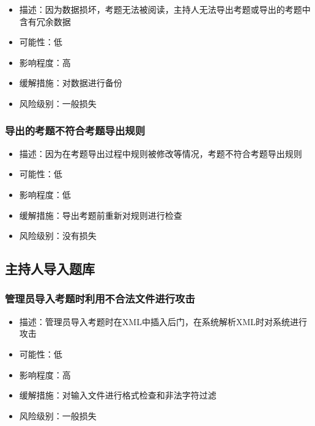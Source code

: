 \documentclass[hyperref, a4paper]{ctexart}
\providecommand{\tightlist}{%
  \setlength{\itemsep}{0pt}\setlength{\parskip}{0pt}}
\begin{document}
\begin{itemize}
\tightlist
\item
  描述：因为数据损坏，考题无法被阅读，主持人无法导出考题或导出的考题中含有冗余数据
\item
  可能性：低
\item
  影响程度：高
\item
  缓解措施：对数据进行备份
\item
  风险级别：一般损失
\end{itemize}

\hypertarget{ux5bfcux51faux7684ux8003ux9898ux4e0dux7b26ux5408ux8003ux9898ux5bfcux51faux89c4ux5219}{%
\subsubsection{导出的考题不符合考题导出规则}\label{ux5bfcux51faux7684ux8003ux9898ux4e0dux7b26ux5408ux8003ux9898ux5bfcux51faux89c4ux5219}}

\begin{itemize}
\tightlist
\item
  描述：因为在考题导出过程中规则被修改等情况，考题不符合考题导出规则
\item
  可能性：低
\item
  影响程度：低
\item
  缓解措施：导出考题前重新对规则进行检查
\item
  风险级别：没有损失
\end{itemize}

\hypertarget{ux4e3bux6301ux4ebaux5bfcux5165ux9898ux5e93-1}{%
\subsection{主持人导入题库}\label{ux4e3bux6301ux4ebaux5bfcux5165ux9898ux5e93-1}}

\hypertarget{ux7ba1ux7406ux5458ux5bfcux5165ux8003ux9898ux65f6ux5229ux7528ux4e0dux5408ux6cd5ux6587ux4ef6ux8fdbux884cux653bux51fb}{%
\subsubsection{管理员导入考题时利用不合法文件进行攻击}\label{ux7ba1ux7406ux5458ux5bfcux5165ux8003ux9898ux65f6ux5229ux7528ux4e0dux5408ux6cd5ux6587ux4ef6ux8fdbux884cux653bux51fb}}

\begin{itemize}
\tightlist
\item
  描述：管理员导入考题时在XML中插入后门，在系统解析XML时对系统进行攻击
\item
  可能性：低
\item
  影响程度：高
\item
  缓解措施：对输入文件进行格式检查和非法字符过滤
\item
  风险级别：一般损失
\end{itemize}
\end{document}
